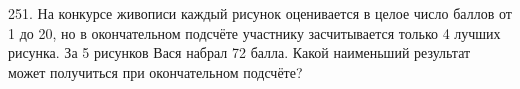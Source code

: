 251. На конкурсе живописи каждый рисунок оценивается в целое число баллов от 1 до 20, но в окончательном подсчёте участнику засчитывается только 4 лучших рисунка. За 5 рисунков Вася набрал 72 балла. Какой наименьший результат может получиться при окончательном подсчёте?\\
